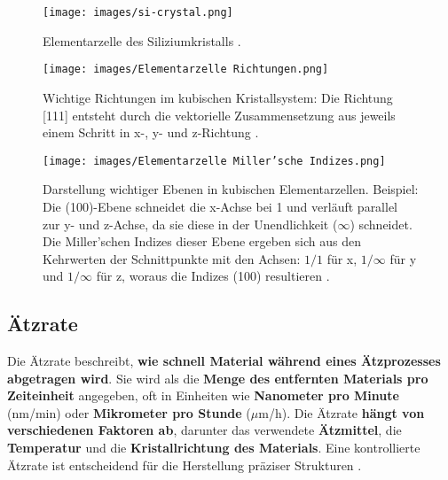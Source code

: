 \documentclass{article} %
\begin{document}
\begin{figure}[htb!]
    \centering
    \texttt{[image: images/si-crystal.png]} %
    \captionsetup{labelfont=bf, width=.55\textwidth} %
    \caption{Elementarzelle des Siliziumkristalls \cite{wilderness_silicon}.}
    \label{fig:Si-Kristall}
\end{figure}

\begin{figure}[htb!]
    \centering
    \texttt{[image: images/Elementarzelle Richtungen.png]} %
    \captionsetup{labelfont=bf, width=\textwidth} %
    \caption{Wichtige Richtungen im kubischen Kristallsystem: Die Richtung [111] entsteht durch die vektorielle Zusammensetzung aus jeweils einem Schritt in x-, y- und z-Richtung \cite{grundlagen_konstruktionswerkstoffe}.}
    \label{fig:Richtungen}
\end{figure}

\begin{figure}[htb!]
    \centering
    \texttt{[image: images/Elementarzelle Miller'sche Indizes.png]} %
    \captionsetup{labelfont=bf, width=.95\textwidth} %
    \caption{Darstellung wichtiger Ebenen in kubischen Elementarzellen. Beispiel: Die (100)-Ebene schneidet die x-Achse bei 1 und verläuft parallel zur y- und z-Achse, da sie diese in der Unendlichkeit ($\infty$) schneidet. Die Miller'schen Indizes dieser Ebene ergeben sich aus den Kehrwerten der Schnittpunkte mit den Achsen: $1/1$ für x, $1/\infty$ für y und $1/\infty$ für z, woraus die Indizes (100) resultieren \cite{grundlagen_konstruktionswerkstoffe}.}
    \label{fig:Miller}
\end{figure}





\vspace{1em}

\subsection{Ätzrate}

Die Ätzrate beschreibt, \textbf{wie schnell Material während eines Ätzprozesses abgetragen wird}. Sie wird als die \textbf{Menge des entfernten Materials pro Zeiteinheit} angegeben, oft in Einheiten wie \textbf{Nanometer pro Minute} (nm/min) oder \textbf{Mikrometer pro Stunde} ($\mu$m/h). Die Ätzrate \textbf{hängt von verschiedenen Faktoren ab}, darunter das verwendete \textbf{Ätzmittel}, die \textbf{Temperatur} und die \textbf{Kristallrichtung des Materials}. Eine kontrollierte Ätzrate ist entscheidend für die Herstellung präziser Strukturen \cite{madou2002, schmid2024Aetzen}. 
\end{document}
